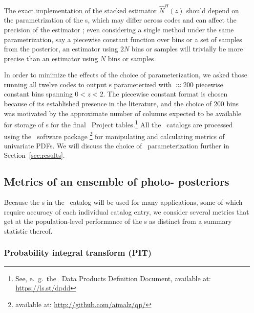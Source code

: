 The exact implementation of the stacked estimator $\hat{N}^{H}(z)$ should depend on the parametrization of the \pzpdf s, which may differ across codes and can affect the precision of the estimator \citep{Malz:qp}; even considering a single method under the same parametrization, say a piecewise constant function over bins or a set of samples from the posterior, an estimator using $2N$ bins or samples will trivially be more precise than an estimator using $N$ bins or samples.

In order to minimize the effects of the choice of parameterization, we asked those running all twelve codes to output \pzpdf s parameterized with $\approx 200$ piecewise constant bins spanning $0<z<2$.
The piecewise constant format is chosen because of its established presence in the literature, and the choice of 200 bins was motivated by the approximate number of columns expected to be available for storage of \pzpdf s for the final \lsst\ Project tables.\footnote{See, e.~g.~the \lsst\ Data Products Definition Document, available at: \url{https://ls.st/dpdd}}
All the \pzpdf\ catalogs are processed using the \qp\ software package \citep{Malz:qp}\footnote{available at: \url{http://github.com/aimalz/qp/}} for manipulating and calculating metrics of univariate PDFs.
We will discuss the choice of \pzpdf\ parameterization further in Section~\ref{sec:results}.


\subsection{Metrics of an ensemble of photo- posteriors}
\label{sec:qualmet}

Because the \pzpdf s in the \lsst\ catalog will be used for many applications, some of which require accuracy of each individual catalog entry, we consider several metrics that get at the population-level performance of the \pzpdf s as distinct from a summary statistic thereof.

\subsubsection{Probability integral transform (PIT)}
\label{sec:pit}

